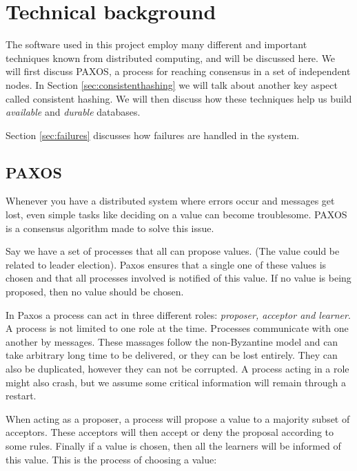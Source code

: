 
\section{Technical background}

The software used in this project employ many different and important techniques known from distributed computing, and will be discussed here.
We will first discuss PAXOS, a process for reaching consensus in a set of independent nodes.
In Section \ref{sec:consistenthashing} we will talk about another key aspect called consistent hashing.
We will then discuss how these techniques help us build \emph{available} and \emph{durable} databases.

Section \ref{sec:failures} discusses how failures are handled in the system.

\subsection{PAXOS}
Whenever you have a distributed system where errors occur and messages get lost, even simple tasks like deciding on a value can become troublesome. PAXOS is a consensus algorithm made to solve this issue. 

Say we have a set of processes that all can propose values. (The value could be related to leader election). Paxos ensures that a single one of these values is chosen and that all processes involved is notified of this value. If no value is being proposed, then no value should be chosen. 

In Paxos a process can act in three different roles: {\it proposer, acceptor and learner}. A process is not limited to one role at the time. Processes communicate with one another by messages. These massages follow the non-Byzantine model and can take arbitrary long time to be delivered, or they can be lost entirely. They can also be duplicated, however they can not be corrupted. A process acting in a role might also crash, but we assume some critical information will remain through a restart. 

When acting as a proposer, a process will propose a value to a majority subset of acceptors. These acceptors will then accept or deny the proposal according to some rules. Finally if a value is chosen, then all the learners will be informed of this value. This is the process of choosing a value:

